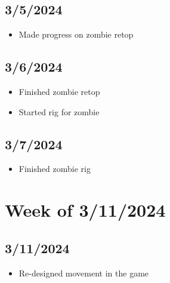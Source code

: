 \documentclass{article}
\begin{document}
\subsection*{3/5/2024}
\begin{itemize}
   \item Made progress on zombie retop
\end{itemize}
\subsection*{3/6/2024}
\begin{itemize}
   \item Finished zombie retop
   \item Started rig for zombie
\end{itemize}
\subsection*{3/7/2024}
\begin{itemize}
   \item Finished zombie rig
\end{itemize}

\section*{Week of 3/11/2024}
\subsection*{3/11/2024}
\begin{itemize}
   \item Re-designed movement in the game
\end{itemize}
\end{document}
